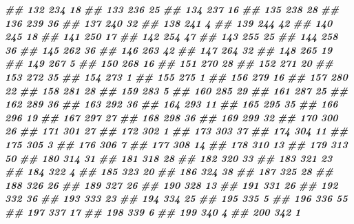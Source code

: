 \documentclass[
]{book}
\newenvironment{Shaded}{\begin{snugshade}}{\end{snugshade}}
\newcommand{\DocumentationTok}[1]{\textcolor[rgb]{0.56,0.35,0.01}{\textbf{\textit{#1}}}}
\theoremstyle{definition}
\theoremstyle{definition}
\theoremstyle{definition}
\theoremstyle{definition}
\theoremstyle{remark}
\begin{document}
\begin{Shaded}
\begin{Highlighting}[]
\DocumentationTok{\#\# 132    234 18}
\DocumentationTok{\#\# 133    236 25}
\DocumentationTok{\#\# 134    237 16}
\DocumentationTok{\#\# 135    238 28}
\DocumentationTok{\#\# 136    239 36}
\DocumentationTok{\#\# 137    240 32}
\DocumentationTok{\#\# 138    241  4}
\DocumentationTok{\#\# 139    244 42}
\DocumentationTok{\#\# 140    245 18}
\DocumentationTok{\#\# 141    250 17}
\DocumentationTok{\#\# 142    254 47}
\DocumentationTok{\#\# 143    255 25}
\DocumentationTok{\#\# 144    258 36}
\DocumentationTok{\#\# 145    262 36}
\DocumentationTok{\#\# 146    263 42}
\DocumentationTok{\#\# 147    264 32}
\DocumentationTok{\#\# 148    265 19}
\DocumentationTok{\#\# 149    267  5}
\DocumentationTok{\#\# 150    268 16}
\DocumentationTok{\#\# 151    270 28}
\DocumentationTok{\#\# 152    271 20}
\DocumentationTok{\#\# 153    272 35}
\DocumentationTok{\#\# 154    273  1}
\DocumentationTok{\#\# 155    275  1}
\DocumentationTok{\#\# 156    279 16}
\DocumentationTok{\#\# 157    280 22}
\DocumentationTok{\#\# 158    281 28}
\DocumentationTok{\#\# 159    283  5}
\DocumentationTok{\#\# 160    285 29}
\DocumentationTok{\#\# 161    287 25}
\DocumentationTok{\#\# 162    289 36}
\DocumentationTok{\#\# 163    292 36}
\DocumentationTok{\#\# 164    293 11}
\DocumentationTok{\#\# 165    295 35}
\DocumentationTok{\#\# 166    296 19}
\DocumentationTok{\#\# 167    297 27}
\DocumentationTok{\#\# 168    298 36}
\DocumentationTok{\#\# 169    299 32}
\DocumentationTok{\#\# 170    300 26}
\DocumentationTok{\#\# 171    301 27}
\DocumentationTok{\#\# 172    302  1}
\DocumentationTok{\#\# 173    303 37}
\DocumentationTok{\#\# 174    304 11}
\DocumentationTok{\#\# 175    305  3}
\DocumentationTok{\#\# 176    306  7}
\DocumentationTok{\#\# 177    308 14}
\DocumentationTok{\#\# 178    310 13}
\DocumentationTok{\#\# 179    313 50}
\DocumentationTok{\#\# 180    314 31}
\DocumentationTok{\#\# 181    318 28}
\DocumentationTok{\#\# 182    320 33}
\DocumentationTok{\#\# 183    321 23}
\DocumentationTok{\#\# 184    322  4}
\DocumentationTok{\#\# 185    323 20}
\DocumentationTok{\#\# 186    324 38}
\DocumentationTok{\#\# 187    325 28}
\DocumentationTok{\#\# 188    326 26}
\DocumentationTok{\#\# 189    327 26}
\DocumentationTok{\#\# 190    328 13}
\DocumentationTok{\#\# 191    331 26}
\DocumentationTok{\#\# 192    332 36}
\DocumentationTok{\#\# 193    333 23}
\DocumentationTok{\#\# 194    334 25}
\DocumentationTok{\#\# 195    335  5}
\DocumentationTok{\#\# 196    336 55}
\DocumentationTok{\#\# 197    337 17}
\DocumentationTok{\#\# 198    339  6}
\DocumentationTok{\#\# 199    340  4}
\DocumentationTok{\#\# 200    342  1}

\end{Highlighting}
\end{Shaded}
\end{document}
